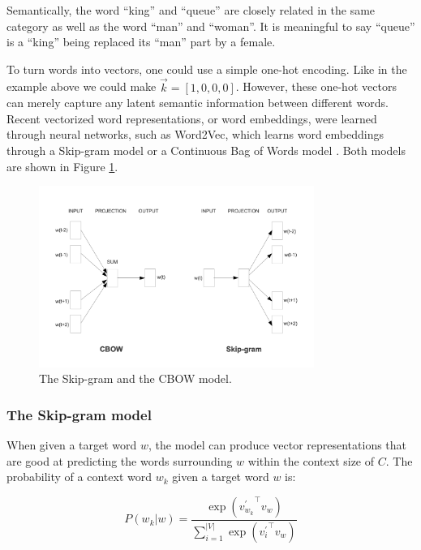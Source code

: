 \documentclass[thesis,fonts=libertine]{cluu}
\begin{document}
Semantically, the word ``king'' and ``queue'' are closely related in the same category as well as the word ``man'' and ``woman''. It is meaningful to say ``queue'' is a ``king'' being replaced its ``man'' part by a female.

To turn words into vectors, one could use a simple one-hot encoding. Like in the example above we could make $\vec{k}=[1, 0, 0, 0]$. However, these one-hot vectors can merely capture any latent semantic information between different words. Recent vectorized word representations, or word embeddings, were learned through neural networks, such as Word2Vec, which learns word embeddings through a Skip-gram model or a Continuous Bag of Words model \parencite{Mikolov:2013ab}. Both models are shown in Figure \ref{fig:skip_gram_and_cbow}.

\begin{figure}
  \label{fig:skip_gram_and_cbow}
  \centering
  \includegraphics[width=0.8\textwidth]{skip_gram_and_cbow_models.png}
  \caption{The Skip-gram and the CBOW model. \parencite{Mikolov:2013ac}}
\end{figure}

\subsubsection{The Skip-gram model}

When given a target word $w$, the model can produce vector representations that are good at predicting the words surrounding $w$ within the context size of $C$. The probability of a context word $w_k$ given a target word $w$ is:

\begin{equation}
  P(w_k|w)=\frac{\exp({v_{w_k}^\prime}^\intercal v_w)}{\sum_{i=1}^{|V|}\exp({v^\prime_i}^\intercal v_w)}
\end{equation}
\end{document}
